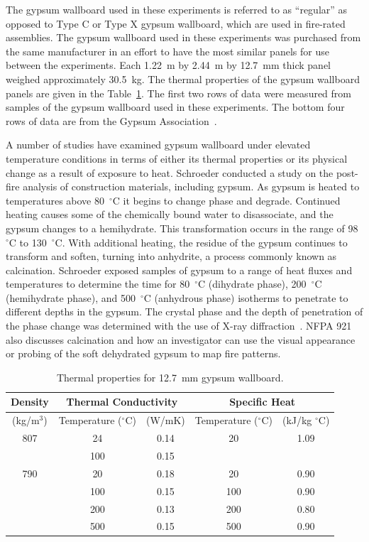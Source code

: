 \documentclass[twoside]{uocthesis}
\begin{document}
{The gypsum wallboard used in these experiments is referred to as ``regular'' as opposed to Type C or Type X gypsum wallboard, which are used in fire-rated assemblies. The gypsum wallboard used in these experiments was purchased from the same manufacturer in an effort to have the most similar panels for use between the experiments. Each 1.22~m by 2.44~m by 12.7~mm thick panel weighed approximately 30.5~kg.  The thermal properties of the gypsum wallboard panels are given in the Table~\ref{tab:Gypsum wallboard_Thermal_Properties}.  The first two rows of data were measured from samples of the gypsum wallboard used in these experiments.  The bottom four rows of data are from the Gypsum Association~\cite{Gross:1985}.

A number of studies have examined gypsum wallboard under elevated temperature conditions in terms of either its thermal properties or its physical change as a result of exposure to heat.  Schroeder conducted a study on the post-fire analysis of construction materials, including gypsum.  As gypsum is heated to temperatures above 80~$^\circ$C it begins to change phase and degrade.  Continued heating causes some of the chemically bound water to disassociate, and the gypsum changes to a hemihydrate.  This transformation occurs in the range of 98~$^\circ$C to 130~$^\circ$C. With additional heating, the residue of the gypsum continues to transform and soften, turning into anhydrite, a process commonly known as calcination.  Schroeder exposed samples of gypsum to a range of heat fluxes and temperatures to determine the time for 80~$^\circ$C (dihydrate phase), 200~$^\circ$C (hemihydrate phase), and 500~$^\circ$C (anhydrous phase) isotherms to penetrate to different depths in the gypsum.  The crystal phase and the depth of penetration of the phase change was determined with the use of X-ray diffraction~\cite{Schroeder:1999}.  NFPA 921 also discusses calcination and how an investigator can use the visual appearance or probing of the soft dehydrated gypsum to map fire patterns.

\begin{table}
	\centering
	\begin{tabular}{|c|c|c|c|c|}
		\hline Density & \multicolumn{2}{c|}{Thermal Conductivity}   & \multicolumn{2}{c|}{Specific Heat}  \\
		\hline (kg/m$^3$) & Temperature ($^{\circ}$C) & (W/mK)  & Temperature ($^{\circ}$C)  & (kJ/kg $^{\circ}$C) \\ 
		\hline 807  & 24 	& 0.14 	& 20	& 1.09 \\
		\hline  	& 100 	& 0.15  &  		&  \\
		\hline 790 	& 20 	& 0.18	& 20 	& 0.90 \\
		\hline  	& 100 	& 0.15 	& 100 	& 0.90 \\
		\hline  	& 200 	& 0.13 	& 200 	& 0.80 \\
		\hline  	& 500 	& 0.15 	& 500	& 0.90 \\
		\hline
		\end{tabular}
		\caption[Thermal properties for 12.7~mm gypsum wallboard.]{Thermal properties for 12.7~mm gypsum wallboard.}
		\label{tab:Gypsum wallboard_Thermal_Properties}
		\end{table}


}
\end{document}
